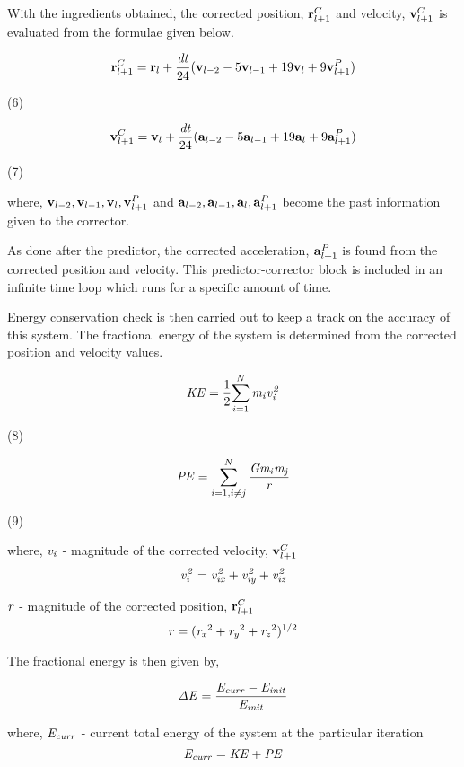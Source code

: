 \documentclass{article}
\begin{document}
{{With the ingredients obtained, the corrected position, ${\bf r}_{l+1}^C$ and velocity, ${\bf v}_{l+1}^C$ is evaluated from the formulae given below.
\smallskip

\[ {\bf r}_{l+1}^C = {\bf r}_l + \frac{{\it dt}} {24} ({\bf v}_{l-2} - 5{\bf v}_{l-1} + 19{\bf v}_l + 9{\bf v}_{l+1}^P) \]
\begin{flushright} (6) \end{flushright}

\[ {\bf v}_{l+1}^C = {\bf v}_l + \frac{{\it dt}} {24} ({\bf a}_{l-2} - 5{\bf a}_{l-1} + 19{\bf a}_l + 9{\bf a}_{l+1}^P) \]
\begin{flushright} (7) \end{flushright}

\smallskip

where,
\smallskip
${\bf v}_{l-2}, {\bf v}_{l-1}, {\bf v}_l, {\bf v}_{l+1}^P$ and ${\bf a}_{l-2}, {\bf a}_{l-1}, {\bf a}_l, {\bf a}_{l+1}^P$ become the past information given to the corrector.
\smallskip

As done after the predictor, the corrected acceleration, ${\bf a}_{l+1}^P$ is found from the corrected position and velocity. This predictor-corrector block is included in an infinite time loop which runs for a specific amount of time. 

Energy conservation check is then carried out to keep a track on the accuracy of this system. The fractional energy of the system is determined from the corrected position and velocity values.

\[ {\it KE} = \frac{1}{2} { \sum_{i=1}^N {\it m_i} {\it v_i^2}} \] 
\begin{flushright} (8) \end{flushright}

\[ {\it PE} = \sum_{i=1,i \neq j}^{N} \frac{\it Gm_i m_j}{\it r} \]
\begin{flushright} (9) \end{flushright}

where,
${\it v_i}$ - magnitude of the corrected velocity, ${\bf v}_{l+1}^C$
\[ {\it v_i^2 = v_{ix}^2 + v_{iy}^2 + v_{iz}^2} \]

${\it r}$ - magnitude of the corrected position, ${\bf r}_{l+1}^C$
\[ {\it r} = ({\it r_x}^2 + {\it r_y}^2 + {\it r_z}^2 )^{1/2}\]

The fractional energy is then given by,

\[ {\it \Delta E} = \frac{\it {E_{curr} - E_{init}}} {\it E_{init}} \]

where,
$\it E_{curr}$ - current total energy of the system at the particular iteration
\[ {\it E_{curr}} = {\it KE} + {\it PE} \]

}}
\end{document}
